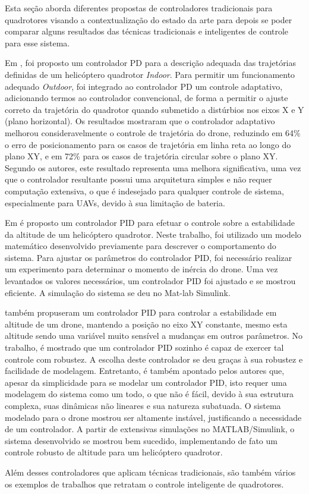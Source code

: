 Esta seção aborda diferentes propostas de controladores tradicionais para quadrotores visando a contextualização do estado da arte para depois se poder comparar alguns resultados das técnicas tradicionais e inteligentes de controle para esse sistema.

Em \cite{Razinkova2014}, foi proposto um controlador PD para a descrição adequada das trajetórias definidas de um helicóptero quadrotor \textit{Indoor}. Para permitir um funcionamento adequado \textit{Outdoor}, foi integrado ao controlador PD um controle adaptativo, adicionando termos ao controlador convencional, de forma a permitir o ajuste correto da trajetória do quadrotor quando submetido a distúrbios nos eixos X e Y (plano horizontal). Os resultados mostraram que o controlador adaptativo melhorou consideravelmente o controle de trajetória do drone, reduzindo em 64\% o erro de posicionamento para os casos de trajetória em linha reta ao longo do plano XY, e em 72\% para os casos de trajetória circular sobre o plano XY. Segundo os autores, este resultado representa uma melhora significativa, uma vez que o controlador resultante possui uma arquitetura simples e não requer computação extensiva, o que é indesejado para qualquer controle de sistema, especialmente para UAVs, devido à sua limitação de bateria.

Em \cite{Mustapa2014} é proposto um controlador PID para efetuar o controle sobre a estabilidade da altitude de um helicóptero quadrotor. Neste trabalho, foi utilizado um modelo matemático desenvolvido previamente para descrever o comportamento do sistema. Para ajustar os parâmetros do controlador PID, foi necessário realizar um experimento para determinar o momento de inércia do drone. Uma vez levantados os valores necessários, um controlador PID foi ajustado e se mostrou eficiente. A simulação do sistema se deu no Mat-lab Simulink.

 também propuseram um controlador PID para controlar a estabilidade em altitude de um drone, mantendo a posição no eixo XY constante, mesmo esta altitude sendo uma variável muito sensível a mudanças em outros parâmetros. No trabalho, é mostrado que um controlador PID sozinho é capaz de exercer tal controle com robustez. A escolha deste controlador se deu graças à sua robustez e facilidade de modelagem. Entretanto, é também apontado pelos autores que, apesar da simplicidade para se modelar um controlador PID, isto requer uma modelagem do sistema como um todo, o que não é fácil, devido à sua estrutura complexa, suas dinâmicas não lineares e sua natureza subatuada. O sistema modelado para o drone mostrou ser altamente instável, justificando a necessidade de um controlador. A partir de extensivas simulações no MATLAB/Simulink, o sistema desenvolvido se mostrou bem sucedido, implementando de fato um controle robusto de altitude para um helicóptero quadrotor.

Além desses controladores que aplicam técnicas tradicionais, são também vários os exemplos de trabalhos que retratam o controle inteligente de quadrotores.